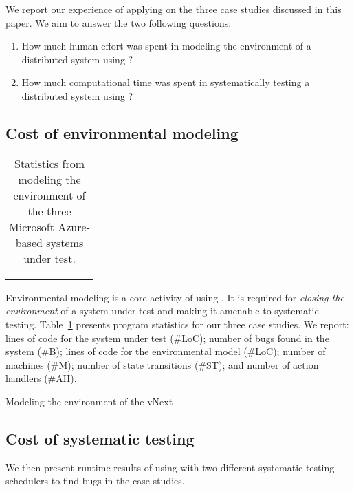 We report our experience of applying \psharp on the three case studies discussed in this paper. We aim to answer the two following questions:

\begin{enumerate}
\item How much human effort was spent in modeling the environment of a distributed system using \psharp?

\item How much computational time was spent in systematically testing a distributed system using \psharp?
\end{enumerate}

\subsection{Cost of environmental modeling}
\label{sec:eval:human_cost}

\newcommand{\colspacing}{\hspace{1.8em}}
\begin{table}[t]
\small
\centering
\setlength{\tabcolsep}{0.3em}
\begin{tabular}{l rrrrr rr}
\centering

\end{tabular}
\caption{Statistics from modeling the environment of the three Microsoft Azure-based systems under test.}
\label{tab:stats}
\end{table}

Environmental modeling is a core activity of using \psharp. It is required for \emph{closing the environment} of a system under test and making it amenable to systematic testing. Table~\ref{tab:stats} presents program statistics for our three case studies. We report: lines of code for the system under test (\#LoC); number of bugs found in the system (\#B); lines of \psharp code for the environmental model (\#LoC); number of machines (\#M); number of state transitions (\#ST); and number of action handlers (\#AH).

Modeling the environment of the vNext


\subsection{Cost of systematic testing}
\label{sec:eval:machine_cost}

We then present runtime results of using \psharp with two different systematic testing schedulers to find bugs in the case studies.


